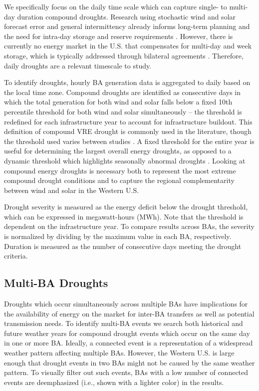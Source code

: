 \documentclass{agujournal2019}
\begin{document}
We specifically focus on the daily time scale which can capture single- to multi-day duration compound droughts. Research using stochastic wind and solar forecast error and general intermittency already informs long-term planning and the need for intra-day storage and reserve requirements \cite{Ghosal2023}. However, there is currently no energy market in the U.S. that compensates for multi-day and week storage, which is typically addressed through bilateral agreements \cite{Bhatnagar2022}. Therefore, daily droughts are a relevant timescale to study. 

To identify droughts, hourly BA generation data is aggregated to daily based on the local time zone. Compound droughts are identified as consecutive days in which the total generation for both wind and solar falls below a fixed 10th percentile threshold for both wind and solar simultaneously -- the threshold is redefined for each infrastructure year to account for infrastructure buildout. This definition of compound VRE drought is commonly used in the literature, though the threshold used varies between studies \cite{Allen2023a,Kittel2024}. A fixed threshold for the entire year is useful for determining the largest overall energy droughts, as opposed to a dynamic threshold which highlights seasonally abnormal droughts \cite{Bracken2024}. Looking at compound energy droughts is necessary both to represent the most extreme compound drought conditions and to capture the regional complementarity between wind and solar in the Western U.S.     

Drought severity is measured as the energy deficit below the drought threshold, which can be expressed in megawatt-hours (MWh). Note that the threshold is dependent on the infrastructure year. To compare results across BAs, the severity is normalized by dividing by the maximum value in each BA, respectively. Duration is measured as the number of consecutive days meeting the drought criteria. 

\subsection{Multi-BA Droughts}

Droughts which occur simultaneously across multiple BAs have implications for the availability of energy on the market for inter-BA transfers as well as potential transmission needs. To identify multi-BA events we search both historical and future weather years for compound drought events which occur on the same day in one or more BA. Ideally, a connected event is a representation of a widespread weather pattern affecting multiple BAs. However, the Western U.S. is large enough that drought events in two BAs might not be caused by the same weather pattern. To visually filter out such events, BAs with a low number of connected events are deemphasized (i.e., shown with a lighter color) in the results. 
\end{document}
